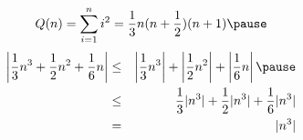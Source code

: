 \documentclass[30pt,landscape]{foils}
\begin{document}
\[
   Q(n) = \sum_{i=1}^{n}i^{2} =
         \frac{1}{3}n(n+\frac{1}{2})(n+1)\pause
\]
\begin{eqnarray*}
\left|\frac{1}{3}n^3+\frac{1}{2}n^{2}+\frac{1}{6}n\right|
 &\leq&\left|\frac{1}{3}n^3\right|+\left|\frac{1}{2}n^{2}\right|
         +\left|\frac{1}{6}n\right|\pause\\
 &\leq&\frac{1}{3}|n^{3}|+\frac{1}{2}|n^{3}|+\frac{1}{6}|n^{3}|\\
 &=&|n^{3}|
\end{eqnarray*}
\end{document}
